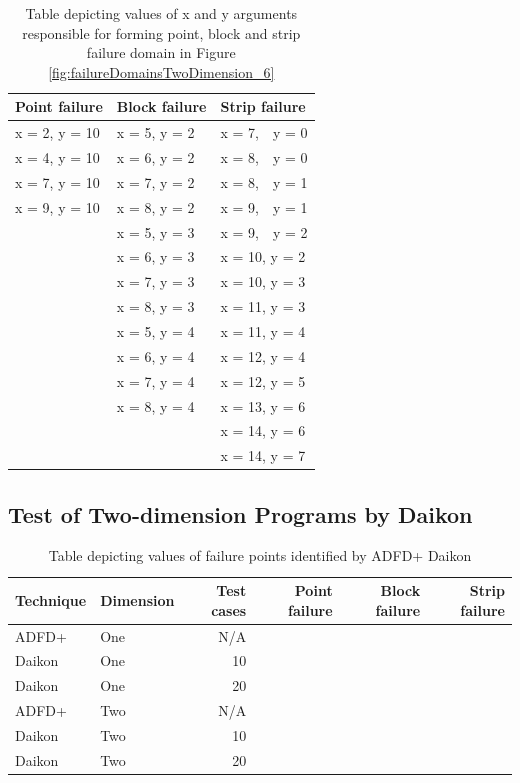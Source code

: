 \begin{table}[h]
\caption{Table depicting values of x and y arguments responsible for forming point, block and strip failure domain in Figure \ref{fig:failureDomainsTwoDimension_6}}
\bigskip
\centering
{\renewcommand{\arraystretch}{1.3}
\begin{tabular}{|l|l|l|}
\hline
Point failure		& 	Block failure		& 	Strip failure		\\
\hline
x = 2, y = 10	&	x = 5, y = 2		&	x = 7,~~y = 0	\\	
x = 4, y = 10	&	x = 6, y = 2		&	x = 8,~~y = 0	\\	
x = 7, y = 10	&	x = 7, y = 2		&	x = 8,~~y = 1	\\
x = 9, y = 10	& 	x = 8, y = 2 		& 	x = 9,~~y = 1	\\
				& 	x = 5, y = 3 		& 	x = 9,~~y = 2	\\
				& 	x = 6, y = 3 		& 	x = 10, y = 2	\\
				& 	x = 7, y = 3 		& 	x = 10, y = 3	\\
				& 	x = 8, y = 3 		& 	x = 11, y = 3	\\
				& 	x = 5, y = 4 		& 	x = 11, y = 4	\\
				& 	x = 6, y = 4 		& 	x = 12, y = 4	\\
				& 	x = 7, y = 4 		& 	x = 12, y = 5	\\
				& 	x = 8, y = 4 		& 	x = 13, y = 6	\\
				&			      		& 	x = 14, y = 6	\\				
				&			      		& 	x = 14, y = 7	\\
\hline
\end{tabular}
}
\bigskip
\label{failureDomains_6}
\end{table}

\subsection{Test of Two-dimension Programs by Daikon}\label{sec:intro6_12}





\begin{table}[ht]
\caption{Table depicting values of failure points identified by ADFD+ Daikon}
\bigskip
\centering
{\renewcommand{\arraystretch}{1.3}
\begin{tabular}{|l|l|r|r|r|r|}
\hline
Technique 	& Dimension	& Test cases		& 	Point failure		& 	Block failure	& 	Strip failure	\\
\hline
ADFD+		& 	One				& N/A			& 					& 				&				\\
Daikon		& 	One				& 10			&					&				&				\\
Daikon		& 	One				& 20			&					&				&				\\
ADFD+		& 	Two				& N/A			&					&				&				\\
Daikon		& 	Two				& 10			&					&				&				\\
Daikon		& 	Two				& 20			&					&				&				\\
\hline
\end{tabular}
}
\bigskip
\label{table:ADFD+Results_6}
\end{table}




